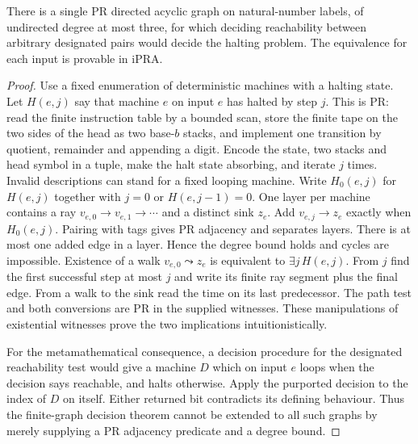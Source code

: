 \begin{proposition}\leavevmode\label{idx:infinite-a-uniform-obstruction-to-deciding-arbitrary-reachabilit}
There is a single PR directed acyclic graph on natural-number labels, of
undirected degree at most three, for which deciding reachability between
arbitrary designated pairs would decide the halting problem. The equivalence
for each input is provable in iPRA.
\end{proposition}
\begin{proof}
Use a fixed enumeration of deterministic machines with a halting state.
Let $H(e,j)$ say that machine $e$ on input $e$ has halted by step $j$.
This is PR: read the finite instruction table by a bounded scan, store the
finite tape on the two sides of the head as two base-$b$ stacks, and implement
one transition by quotient, remainder and appending a digit. Encode the state,
two stacks and head symbol in a tuple, make the halt state absorbing, and
iterate $j$ times. Invalid descriptions can stand for a fixed looping machine.
Write $H_0(e,j)$ for $H(e,j)$ together with $j=0$ or $H(e,j-1)=0$.
One layer per machine contains a ray $v_{e,0}\to v_{e,1}\to\cdots$ and a
distinct sink $z_e$. Add $v_{e,j}\to z_e$ exactly when $H_0(e,j)$.
Pairing with tags gives PR adjacency and separates layers. There is at most
one added edge in a layer. Hence the degree bound holds and cycles are
impossible. Existence of a walk $v_{e,0}\leadsto z_e$ is equivalent to
$\exists j\,H(e,j)$. From $j$ find the first successful step at most $j$ and
write its finite ray segment plus the final edge. From a walk to the sink read
the time on its last predecessor. The path test and both conversions are PR
in the supplied witnesses. These manipulations of existential witnesses prove
the two implications intuitionistically.

For the metamathematical consequence, a decision procedure for the designated
reachability test would give a machine $D$ which on input $e$ loops when the
decision says reachable, and halts otherwise. Apply the purported decision to
the index of $D$ on itself. Either returned bit contradicts its defining
behaviour. Thus the finite-graph decision theorem cannot be extended to all
such graphs by merely supplying a PR adjacency predicate and a degree bound.
\end{proof}
